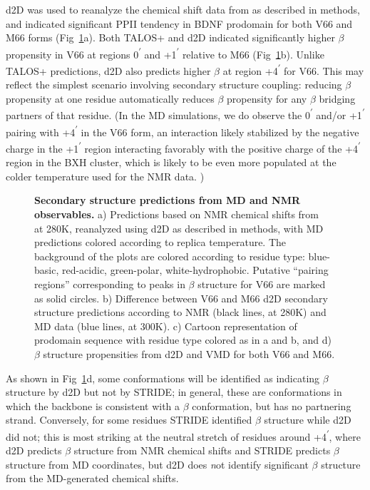 \documentclass[10pt,letterpaper]{article}
\begin{document}
d2D was used to reanalyze the chemical shift data from\cite{Anastasia2013} as described in methods, and indicated significant PPII tendency in BDNF prodomain 
 for both V66 and M66 forms (Fig~\ref{fig2}a). Both TALOS+ and d2D indicated significantly higher $\beta$ propensity in V66 at regions 0\textsuperscript{$\prime$} and +1\textsuperscript{$\prime$} relative to M66 (Fig~\ref{fig2}b). Unlike TALOS+ predictions, d2D also predicts higher $\beta$ at region +4\textsuperscript{$\prime$} for V66.  This may reflect the simplest scenario involving secondary structure coupling: reducing $\beta$ propensity at one residue automatically reduces $\beta$ propensity for any $\beta$ bridging partners of that residue.  (In the MD simulations, we do observe the 0\textsuperscript{$\prime$} and/or +1\textsuperscript{$\prime$}  pairing with +4\textsuperscript{$\prime$} in the V66 form, an interaction likely stabilized by the negative charge in the +1\textsuperscript{$\prime$} region interacting favorably with the positive charge of the +4\textsuperscript{$\prime$} region in the BXH cluster, which is likely to be even more populated at the colder temperature used for the NMR data. ) 

 \begin{figure}[!ht]
\caption{{\bf Secondary structure predictions from MD and NMR observables.} a) Predictions based on NMR chemical shifts from ~\cite{Anastasia2013}  at 280K, reanalyzed using d2D as described in methods, with MD predictions colored according to replica temperature.  The background of the plots are colored according to residue type: blue-basic, red-acidic, green-polar, white-hydrophobic. Putative ``pairing regions'' corresponding to peaks in $\beta$ structure for V66 are marked as solid circles. b) Difference between V66 and M66 d2D secondary structure predictions according to NMR (black lines, at 280K) and MD data (blue lines, at 300K). c) Cartoon representation of prodomain sequence with residue type colored as in a and b, and  d) $\beta$ structure propensities from d2D and VMD for both V66 and M66. }
\label{fig2} 
\end{figure}

As shown in Fig~\ref{fig2}d, some conformations will be identified as indicating $\beta$ structure by d2D but not by STRIDE; in general, these are conformations in which the backbone is consistent with a $\beta$ conformation, but has no partnering strand.  Conversely, for some residues STRIDE identified $\beta$ structure while d2D did not; this is most striking at the neutral stretch of residues around +4\textsuperscript{$\prime$}, where d2D predicts $\beta$ structure from NMR chemical shifts and STRIDE predicts $\beta$ structure from MD coordinates, but d2D does {\emph not} identify significant $\beta$ structure from the MD-generated chemical shifts. 
\end{document}
